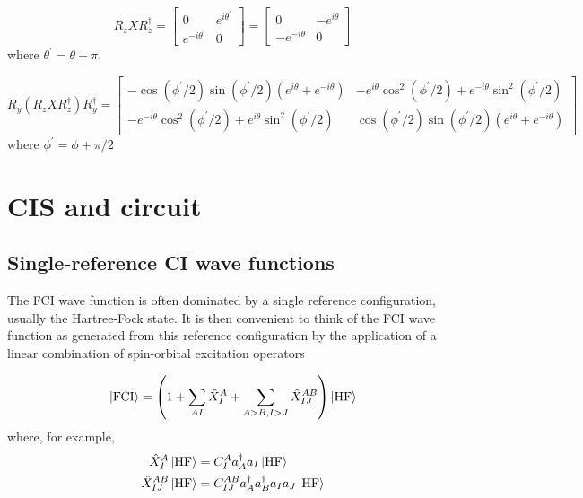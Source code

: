 \documentclass[11pt, oneside]{article}   	%
\begin{document}
\begin{equation}
R_z X R^{\dagger}_z
= 
\begin{bmatrix}
0 & e^{i \theta^{\prime}}  \\
e^{-i \theta^{\prime}}  & 0
\end{bmatrix}
= 
\begin{bmatrix}
0 & -e^{i \theta}  \\
-e^{-i \theta}  & 0
\end{bmatrix}
\end{equation}
where $\theta^{\prime} = \theta + \pi$.

\begin{equation}
R_y (R_z X R^{\dagger}_z) R^{\dagger}_y
= 
\begin{bmatrix}
-\cos(\phi^{\prime}/2) \sin(\phi^{\prime}/2) (e^{i \theta} + e^{-i \theta} ) & -e^{i \theta} \cos^2(\phi^{\prime}/2) + e^{-i \theta} \sin^2(\phi^{\prime}/2) \\
-e^{-i \theta} \cos^2(\phi^{\prime}/2) + e^{i \theta} \sin^2(\phi^{\prime}/2) & \cos(\phi^{\prime}/2) \sin(\phi^{\prime}/2) (e^{i \theta} + e^{-i \theta} ) 
\end{bmatrix}
\end{equation}
where $\phi^{\prime} = \phi + \pi/2$

\section{CIS and circuit}
\subsection{Single-reference CI wave functions}
The FCI wave function is often dominated by a single reference configuration, usually the Hartree-Fock state.
It is then convenient to think of the FCI wave function as generated from this reference configuration by the application of a linear combination of spin-orbital excitation operators

\begin{equation}
\ket{\text{FCI}} = \left( 1 + \sum_{AI} \hat{X}^A_I + \sum_{A>B, I>J} \hat{X}^{AB}_{IJ} \right) \ket{\text{HF}} 
\end{equation}
where, for example,
\begin{align}
\hat{X}^A_I \ket{\text{HF}} &= C^A_I a^{\dagger}_A a_I \ket{\text{HF}} \\
\hat{X}^{AB}_{IJ} \ket{\text{HF}} &= C^{AB}_{IJ} a^{\dagger}_A a^{\dagger}_B a_I a_J \ket{\text{HF}} 
\end{align}
\end{document}
